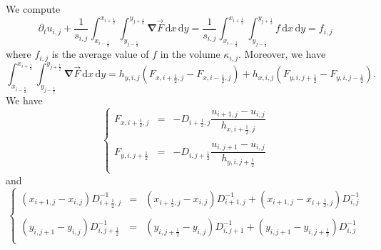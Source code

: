 \documentclass[aps,onecolumn]{revtex4}
\newcommand{\half}{\frac{1}{2}}
\newcommand{\myd}{\,\text{d}}
\begin{document}
We compute
\begin{equation}
	\partial_t u_{i,j} + \dfrac{1}{s_{i,j}} \int_{x_{i-\half}}^{x_{i+\half}} \int_{y_{j-\half}}^{y_{j+\half}} {\bm \nabla} \vec{F} \myd x \myd y
	 = \dfrac{1}{s_{i,j}} \int_{x_{i-\half}}^{x_{i+\half}} \int_{y_{j-\half}}^{y_{j+\half}} f \myd x \myd y = f_{i,j}
\end{equation}
where $f_{i,j}$ is the average value of $f$ in the volume $\kappa_{i,j}$.
Moreover, we have
\begin{equation}
\int_{x_{i-\half}}^{x_{i+\half}} \int_{y_{j-\half}}^{y_{j+\half}} {\bm \nabla} \vec{F} \myd x \myd y = 
h_{y,i,j}\left( F_{x,i+\half,j} - F_{x,i-\half,j} \right) + h_{x,i,j}\left( F_{y,i,j+\half} - F_{y,i,j-\half} \right).
\end{equation}
We have
\begin{equation}
\left\lbrace
\begin{array}{rcl}
	F_{x,i+\half,j} & = & - D_{i+\half,j} \dfrac{u_{i+1,j}-u_{i,j}}{h_{x,i+\half,j}}\\
	\\
	F_{y,i,j+\half} & = & - D_{i,j+\half} \dfrac{u_{i,j+1}-u_{i,j}}{h_{y,i,j+\half}}\\
\end{array}
\right.
\end{equation}
and
\begin{equation}
\left\lbrace
\begin{array}{rcl}
	\left(x_{i+1,j}-x_{i,j}\right) D_{i+\half,j}^{-1}  & = &
		 \left(x_{i+\half,j}-x_{i,j}\right) D_{i+1,j}^{-1} + \left(x_{i+1,j} - x_{i+\half,j}\right) D_{i,j}^{-1} \\
		 \\
	\left(y_{i,j+1}-y_{i,j}\right) D_{i,j+\half}^{-1}  & = &
		 \left(y_{i,j+\half}-y_{i,j}\right) D_{i,j+1}^{-1} + \left(y_{i,j+1} - y_{i,j+\half}\right) D_{i,j}^{-1} \\
\end{array}
\right.
\end{equation}
\end{document}

